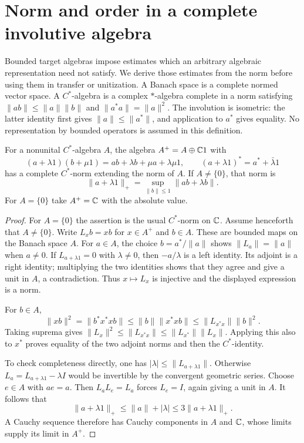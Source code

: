 \section{Norm and order in a complete involutive algebra}
\label{sec:cstar-prerequisites}

Bounded target algebras impose estimates which an arbitrary algebraic
representation need not satisfy.  We derive those estimates from the norm
before using them in transfer or unitization.
A Banach space is a complete normed vector space.
A $C^*$-algebra is a complex $*$-algebra complete in a norm satisfying
$\|ab\|\leq\|a\|\|b\|$ and $\|a^*a\|=\|a\|^2$.
The involution is isometric: the latter identity first gives
$\|a\|\leq\|a^*\|$, and application to $a^*$ gives equality.
No representation by bounded operators is assumed in this definition.

\begin{lemma}
For\label{lem:cstar-adjoin} a nonunital $C^*$-algebra $A$, the algebra $A^+=A\oplus\mathbb C1$ with
\[
 (a+\lambda1)(b+\mu1)=ab+\lambda b+\mu a+\lambda\mu1,
 \qquad (a+\lambda1)^*=a^*+\bar\lambda1
\]
has a complete $C^*$-norm extending the norm of $A$.
If $A\ne\{0\}$, that norm is
\[
 \|a+\lambda1\|_+=\sup_{\|b\|\leq1}\|ab+\lambda b\|.
\]
For $A=\{0\}$ take $A^+=\mathbb C$ with the absolute value.
\end{lemma}

\begin{proof}
For $A=\{0\}$ the assertion is the usual $C^*$-norm on $\mathbb C$.
Assume henceforth that $A\ne\{0\}$.
Write $L_xb=xb$ for $x\in A^+$ and $b\in A$.
These are bounded maps on the Banach space $A$.
For $a\in A$, the choice $b=a^*/\|a\|$ shows
$\|L_a\|=\|a\|$ when $a\ne0$.
If $L_{a+\lambda1}=0$ with $\lambda\ne0$, then $-a/\lambda$ is a left
identity.  Its adjoint is a right identity; multiplying the two identities
shows that they agree and give a unit in $A$, a contradiction.
Thus $x\mapsto L_x$ is injective and the displayed expression is a norm.

For $b\in A$,
\[
 \|xb\|^2=\|b^*x^*xb\|
 \leq\|b\|\|x^*xb\|\leq\|L_{x^*x}\|\|b\|^2.
\]
Taking suprema gives
$\|L_x\|^2\leq\|L_{x^*x}\|\leq\|L_{x^*}\|\|L_x\|$.
Applying this also to $x^*$ proves equality of the two adjoint norms and
then the $C^*$-identity.

To check completeness directly, one has $|\lambda|\leq\|L_{a+\lambda1}\|$.
Otherwise $L_a=L_{a+\lambda1}-\lambda I$ would be invertible by the
convergent geometric series.  Choose $e\in A$ with $ae=a$.
Then $L_aL_e=L_a$ forces $L_e=I$, again giving a unit in $A$.
It follows that
\[
 \|a+\lambda1\|_+\leq\|a\|+|\lambda|
 \leq3\|a+\lambda1\|_+.
\]
A Cauchy sequence therefore has Cauchy components in $A$ and $\mathbb C$, whose
limits supply its limit in $A^+$.
\end{proof}

